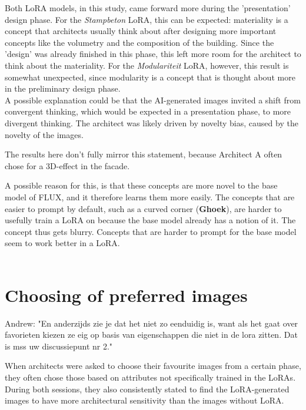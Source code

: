 Both LoRA models, in this study, came forward more during the 'presentation' design phase. For the \textit{Stampbeton} LoRA, this can be expected: materiality is a concept that architects usually think about after designing more important concepts like the volumetry and the composition of the building. Since the 'design' was already finished in this phase, this left more room for the architect to think about the materiality. For the \textit{Modulariteit} LoRA, however, this result is somewhat unexpected, since modularity is a concept that is thought about more in the preliminary design phase. \\
A possible explanation could be that the AI-generated images invited a shift from convergent thinking, which would be expected in a presentation phase, to more divergent thinking. The architect was likely driven by novelty bias, caused by the novelty of the images. 

The results here don't fully mirror this statement, because Architect A often chose for a 3D-effect in the facade.

A possible reason for this, is that these concepts are more novel to the base model of FLUX, and it therefore learns them more easily. The concepts that are easier to prompt by default, such as a curved corner (\textbf{Ghoek}), are harder to usefully train a LoRA on because the base model already has a notion of it. The concept thus gets blurry. Concepts that are harder to prompt for the base model seem to work better in a LoRA.\\~\\

\section{Choosing of preferred images}
Andrew: "En anderzijds zie je dat het niet zo eenduidig is, want als het gaat over favorieten kiezen ze eig op basis van eigenschappen die niet in de lora zitten. Dat is mss uw discussiepunt nr 2."

When architects were asked to choose their favourite images from a certain phase, they often chose those based on attributes not specifically trained in the LoRAs. During both sessions, they also consistently stated to find the LoRA-generated images to have more architectural sensitivity than the images without LoRA.



